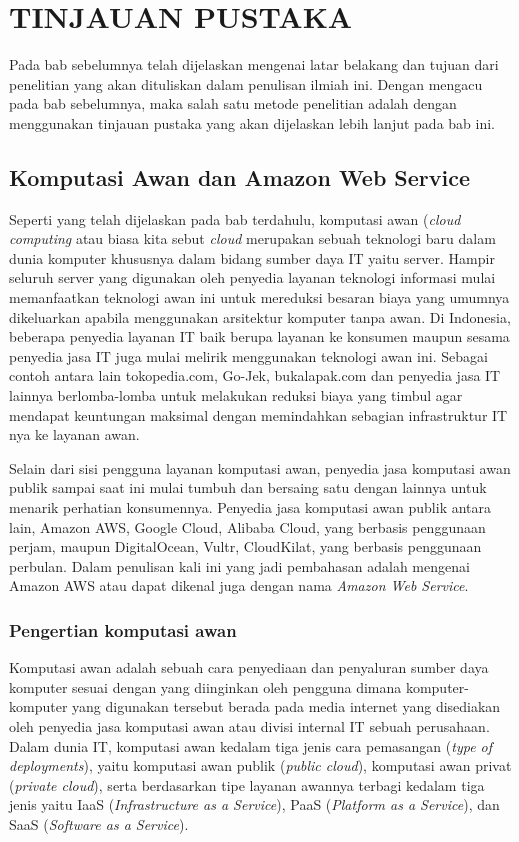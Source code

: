 \documentclass[pi.tex]{subfile}
\begin{document}
\chapter{TINJAUAN PUSTAKA}

Pada bab sebelumnya telah dijelaskan mengenai latar belakang dan tujuan dari penelitian yang akan dituliskan dalam penulisan ilmiah ini. Dengan mengacu pada bab sebelumnya, maka salah satu metode penelitian adalah dengan menggunakan tinjauan pustaka yang akan dijelaskan lebih lanjut pada bab ini.

\section{Komputasi Awan dan Amazon Web Service}
Seperti yang telah dijelaskan pada bab terdahulu, komputasi awan (\emph{cloud computing} atau biasa kita sebut \emph{cloud}  merupakan sebuah teknologi baru dalam dunia komputer khususnya dalam bidang sumber daya IT yaitu server. Hampir seluruh server yang digunakan oleh penyedia layanan teknologi informasi mulai memanfaatkan teknologi awan ini untuk mereduksi besaran biaya yang umumnya dikeluarkan apabila menggunakan arsitektur komputer tanpa awan. Di Indonesia, beberapa penyedia layanan IT baik berupa layanan ke konsumen maupun sesama penyedia jasa IT juga mulai melirik menggunakan teknologi awan ini. Sebagai contoh antara lain tokopedia.com, Go-Jek, bukalapak.com dan penyedia jasa IT lainnya berlomba-lomba untuk melakukan reduksi biaya yang timbul agar mendapat keuntungan maksimal dengan memindahkan sebagian infrastruktur IT nya ke layanan awan.

Selain dari sisi pengguna layanan komputasi awan, penyedia jasa komputasi awan publik sampai saat ini mulai tumbuh dan bersaing satu dengan lainnya untuk menarik perhatian konsumennya. Penyedia jasa komputasi awan publik antara lain, Amazon AWS, Google Cloud, Alibaba Cloud, yang berbasis penggunaan perjam, maupun DigitalOcean, Vultr, CloudKilat, yang berbasis penggunaan perbulan. Dalam penulisan kali ini yang jadi pembahasan adalah mengenai Amazon AWS atau dapat dikenal juga dengan nama \emph{Amazon Web Service}.

\subsection{Pengertian komputasi awan}\hspace{5pt}
Komputasi awan adalah sebuah cara penyediaan dan penyaluran sumber daya komputer sesuai dengan yang diinginkan oleh pengguna dimana komputer-komputer yang digunakan tersebut berada pada media internet yang disediakan oleh penyedia jasa komputasi awan atau divisi internal IT sebuah perusahaan. Dalam dunia IT, komputasi awan kedalam tiga jenis cara pemasangan (\emph{type of deployments}), yaitu komputasi awan publik (\emph{public cloud}), komputasi awan privat (\emph{private cloud}), serta berdasarkan tipe layanan awannya terbagi kedalam tiga jenis yaitu IaaS (\emph{Infrastructure as a Service}), PaaS (\emph{Platform as a Service}), dan SaaS (\emph{Software as a Service}).
\end{document}
